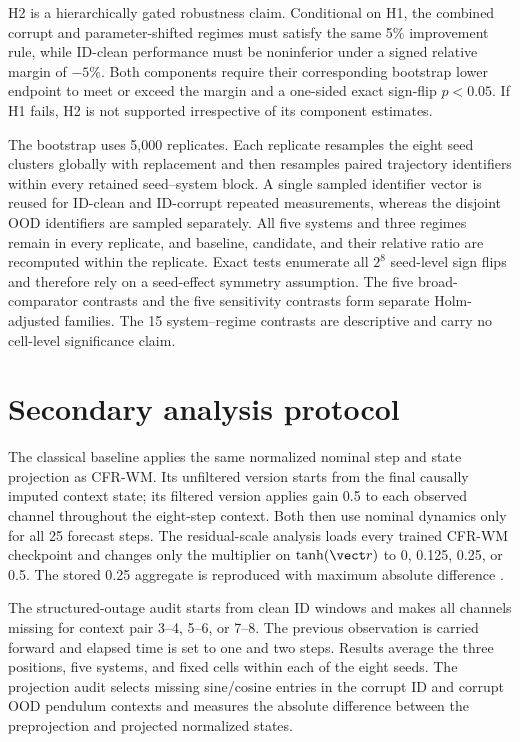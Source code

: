 H2 is a hierarchically gated robustness claim. Conditional on H1, the combined corrupt and parameter-shifted regimes must satisfy the same 5\% improvement rule, while ID-clean performance must be noninferior under a signed relative margin of $-5\%$. Both components require their corresponding bootstrap lower endpoint to meet or exceed the margin and a one-sided exact sign-flip $p<0.05$. If H1 fails, H2 is not supported irrespective of its component estimates.

The bootstrap uses 5,000 replicates. Each replicate resamples the eight seed clusters globally with replacement and then resamples paired trajectory identifiers within every retained seed--system block. A single sampled identifier vector is reused for ID-clean and ID-corrupt repeated measurements, whereas the disjoint OOD identifiers are sampled separately. All five systems and three regimes remain in every replicate, and baseline, candidate, and their relative ratio are recomputed within the replicate. Exact tests enumerate all $2^8$ seed-level sign flips and therefore rely on a seed-effect symmetry assumption. The five broad-comparator contrasts and the five sensitivity contrasts form separate Holm-adjusted families. The 15 system--regime contrasts are descriptive and carry no cell-level significance claim.

\section{Secondary analysis protocol}

The classical baseline applies the same normalized nominal step and state
projection as CFR-WM. Its unfiltered version starts from the final causally
imputed context state; its filtered version applies gain 0.5 to each observed
channel throughout the eight-step context. Both then use nominal dynamics only
for all 25 forecast steps. The residual-scale analysis loads every trained CFR-WM
checkpoint and changes only the multiplier on $\tanh(\vect r)$ to 0, 0.125,
0.25, or 0.5. The stored 0.25 aggregate is reproduced with maximum absolute
difference \ResidualReconstructionDifference{}.

The structured-outage audit starts from clean ID windows and makes all channels
missing for context pair 3--4, 5--6, or 7--8. The previous observation is
carried forward and elapsed time is set to one and two steps. Results average
the three positions, five systems, and fixed cells within each of the eight
seeds. The projection audit selects missing sine/cosine entries in the corrupt
ID and corrupt OOD pendulum contexts and measures the absolute difference
between the preprojection and projected normalized states.


